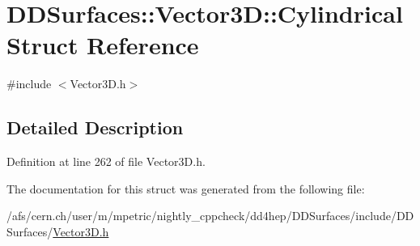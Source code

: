 \hypertarget{struct_d_d_surfaces_1_1_vector3_d_1_1_cylindrical}{}\section{D\+D\+Surfaces\+:\+:Vector3D\+:\+:Cylindrical Struct Reference}
\label{struct_d_d_surfaces_1_1_vector3_d_1_1_cylindrical}


{\ttfamily \#include $<$Vector3\+D.\+h$>$}



\subsection{Detailed Description}


Definition at line 262 of file Vector3\+D.\+h.



The documentation for this struct was generated from the following file\+:\begin{DoxyCompactItemize}
\item 
/afs/cern.\+ch/user/m/mpetric/nightly\+\_\+cppcheck/dd4hep/\+D\+D\+Surfaces/include/\+D\+D\+Surfaces/\hyperlink{_vector3_d_8h}{Vector3\+D.\+h}\end{DoxyCompactItemize}
